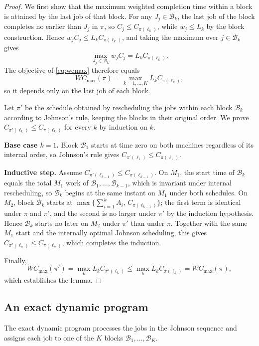 ﻿\documentclass[12pt]{article}
\begin{document}
\begin{sloppypar}
\begin{proof}
We first show that the maximum weighted completion time within a block is attained by the last job of
that block. For any $J_j \in \mathcal{B}_k$, the last job of the block completes no earlier than
$J_j$ in $\pi$, so $C_j \le C_{\pi(\ell_k)}$, while $w_j \le L_k$ by the block construction.
Hence
$w_j C_j \le L_k C_{\pi(\ell_k)}$, and taking the maximum over $j \in \mathcal{B}_k$ gives
\[
\max_{J_j \in \mathcal{B}_k} w_j C_j = L_k C_{\pi(\ell_k)}.
\]
The objective of \cref{eq:wcmax} therefore equals
\[
W C_{\max}(\pi) = \max_{k=1,\dots,K} L_k C_{\pi(\ell_k)},
\]
so it depends only on the last job of each block.

Let $\pi'$ be the schedule obtained by rescheduling the jobs within each block $\mathcal{B}_k$
according to Johnson's rule, keeping the blocks in their original order. We prove
$C_{\pi'(\ell_k)} \le C_{\pi(\ell_k)}$ for every $k$ by induction on $k$.

\textbf{Base case $k=1$.}
Block $\mathcal{B}_1$ starts at time zero on both machines regardless of its internal order, so
Johnson's rule gives $C_{\pi'(\ell_1)} \le C_{\pi(\ell_1)}$.

\textbf{Inductive step.}
Assume $C_{\pi'(\ell_{k-1})} \le C_{\pi(\ell_{k-1})}$. On $M_1$, the start time of $\mathcal{B}_k$
equals the
total $M_1$ work of $\mathcal{B}_1,\dots,\mathcal{B}_{k-1}$, which is invariant under internal
rescheduling, so $\mathcal{B}_k$ begins at the same instant on $M_1$ under both schedules. On $M_2$,
block $\mathcal{B}_k$ starts at $\max\{\sum_{i=1}^{k}A_{i},\,C_{\pi(\ell_{k-1})}\}$; the first term is
identical
under $\pi$ and $\pi'$, and the second is no larger under $\pi'$ by the induction hypothesis. Hence
$\mathcal{B}_k$ starts no later on $M_2$ under $\pi'$ than under $\pi$. Together with the same $M_1$
start and the internally optimal Johnson scheduling, this gives
$C_{\pi'(\ell_k)} \le C_{\pi(\ell_k)}$, which
completes the induction.

Finally,
\[
W C_{\max}(\pi') = \max_{k} L_k C_{\pi'(\ell_k)}
\le \max_{k} L_k C_{\pi(\ell_k)} = W C_{\max}(\pi),
\]
which establishes the lemma.
\end{proof}

\subsection{An exact dynamic program}
The exact dynamic program processes the jobs in the Johnson sequence and assigns each job to one
of the $K$ blocks $\mathcal{B}_1,\dots,\mathcal{B}_K$.


\end{sloppypar}
\end{document}
